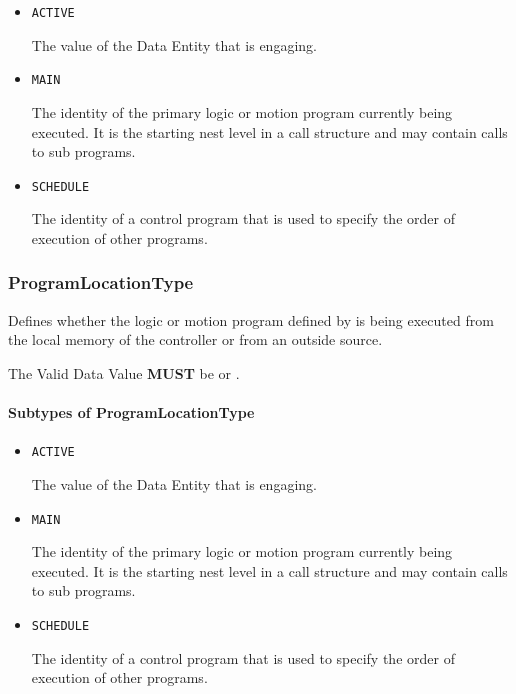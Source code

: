 \begin{itemize}

\item \texttt{ACTIVE}


The value of the \gls{Data Entity} that is engaging.

\item \texttt{MAIN}


The identity of the primary logic or motion program currently being executed. It is the starting nest level in a call structure and may contain calls to sub programs.

\item \texttt{SCHEDULE}


The identity of a control program that is used to specify the order of execution of other programs.


\end{itemize}

\subsubsection{ProgramLocationType}
\label{sec:ProgramLocationType}



Defines whether the logic or motion program defined by  is being executed from the local memory of the controller or from an outside source.
  
 The \gls{Valid Data Value} \textbf{MUST} be  or .


\paragraph{Subtypes of ProgramLocationType}\mbox{}
\label{sec:Subtypes of ProgramLocationType}

\begin{itemize}

\item \texttt{ACTIVE}


The value of the \gls{Data Entity} that is engaging.

\item \texttt{MAIN}


The identity of the primary logic or motion program currently being executed. It is the starting nest level in a call structure and may contain calls to sub programs.

\item \texttt{SCHEDULE}


The identity of a control program that is used to specify the order of execution of other programs.


\end{itemize}

